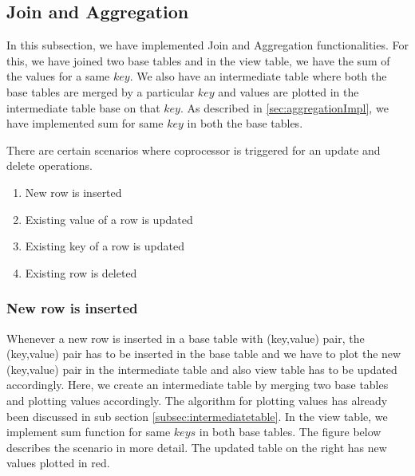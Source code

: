 \documentclass[11pt,a4paper,bibtotoc,idxtotoc,headsepline,footsepline,footexclude,BCOR12mm,DIV13]{scrbook}
\begin{document}
\newpage
\subsection{Join and Aggregation}
\label{subsec:joinandaggregation}
In this subsection, we have implemented Join and Aggregation functionalities. For this, we have joined two base tables and in the view table, we have the sum of the values for a same $key$. We also have an intermediate table where both the base tables are merged by a particular $key$ and values are plotted in the intermediate table base on that $key$. As described in \ref{sec:aggregationImpl}, we have implemented sum for same $key$ in both the base tables. 


    

There are certain scenarios where coprocessor is triggered for an update and delete operations.

\begin{enumerate}
    \item New row is inserted
    \item Existing value of a row is updated
    \item Existing key of a row is updated
    \item Existing row is deleted
\end{enumerate}

\subsubsection{New row is inserted}
Whenever a new row is inserted in a base table with (key,value) pair, the (key,value) pair has to be inserted in the base table and we have to plot the new (key,value) pair in the intermediate table and also view table has to be updated accordingly. Here, we create an intermediate table by merging two base tables and plotting values accordingly. The algorithm for plotting values has already been discussed in sub section \ref{subsec:intermediatetable}. In the view table, we implement sum function for same $keys$ in both base tables.
The figure below describes the scenario in more detail. The updated table on the right has new values plotted in red.
\end{document}
